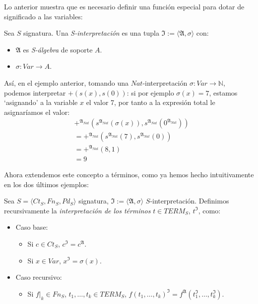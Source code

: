 Lo anterior muestra que es necesario definir una función especial para dotar de significado a las variables:

\begin{definition}
Sea $S$ signatura. Una \textit{S-interpretación} es una tupla $\mathfrak{I} := \langle \mathfrak{A}, \sigma \rangle$ con:
\begin{itemize}
    \item $\mathfrak{A}$ es \textit{S-álgebra} de soporte $A$.
    \item $\sigma : Var \rightarrow A$.
\end{itemize}
\end{definition}

\begin{example}
Así, en el ejemplo anterior, tomando una $Nat$-interpretación $\sigma: Var \rightarrow \mathbb{N}$, podemos interpretar $+(s(x), s(0))$: si por ejemplo $\sigma(x) = 7$, estamos `asignando' a la variable $x$ el valor 7, por tanto a la expresión total le asignaríamos el valor:
\begin{align*}
&+^{\mathfrak{A}_{Nat}}(s^{\mathfrak{A}_{Nat}}(\sigma(x)), s^{\mathfrak{A}_{Nat}}(0^{\mathfrak{A}_{Nat}}))\\
&=+^{\mathfrak{A}_{Nat}}(s^{\mathfrak{A}_{Nat}}(7), s^{\mathfrak{A}_{Nat}}(0))\\
&=+^{\mathfrak{A}_{Nat}}(8,1)\\
&=9
\end{align*}
\end{example}

Ahora extendemos este concepto a términos, como ya hemos hecho intuitivamente en los dos últimos ejemplos:

\begin{definition}
Sea $S = \langle Ct_{S}, Fn_{S}, Pd_{S}\rangle$ signatura, $\mathfrak{I} := \langle \mathfrak{A}, \sigma \rangle$ $S$-interpretación. Definimos recursivamente la \textit{interpretación de los términos} $t \in TERM_S$, $t^{\mathfrak{I}}$, como:
\begin{itemize}
    \item Caso base:
        \begin{itemize}
            \item Si $c \in Ct_S$, $c^{\mathfrak{I}} = c^{\mathfrak{A}}$.
            \item Si $x \in Var$, $x^{\mathfrak{I}} = \sigma(x)$.
        \end{itemize}
    \item Caso recursivo:
        \begin{itemize}
           \item Si $f|_k \in Fn_S$, $t_1, \dots, t_k \in TERM_S$, $f(t_1, \dots, t_k)^{\mathfrak{I}} = f^{\mathfrak{A}}(t_{1}^{\mathfrak{I}}, \dots, t_{k}^{\mathfrak{I}})$.
        \end{itemize}
\end{itemize}
\end{definition}

